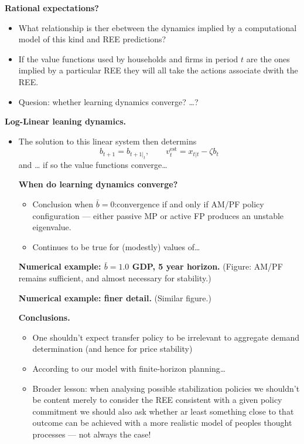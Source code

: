 \medskip\noindent
{\bf Rational expectations?}
\begin{itemize}
\item What relationship is ther ebetween the
dynamics implied by a computational model of
this kind and REE predictions?

\item If the value functions used by
households and firms in period $t$ are the
ones implied by a particular REE they will
all take the actions associate dwith the
REE.

\item Quesion: whether learning dynamics
converge? …?
\end{itemize}

\medskip\noindent
{\bf Log-Linear leaning dynamics.}
\begin{itemize}
\item The solution to this linear system
then determins
$$
b_{t+1}=b_{t+1|_t},\qquad 
v_t^{\operatorname{est}}=x_{t|t}-
\zeta b_t
$$
and …
if so the value functions converge…

\medskip\noindent
{\bf When do learning dynamics converge?}
\begin{itemize}
\item Conclusion when
$\bar{b}=0$:convergence if and only if AM/PF
policy configuration --- either passive MP
or active FP produces an unstable
eigenvalue.

\item Continues to be true for (modestly)
values of…
\end{itemize}

\medskip\noindent
{\bf Numerical example: $\bar{b}=1.0$ GDP, 5
year horizon.} (Figure: AM/PF remains
sufficient, and almost necessary for
stability.)

\medskip\noindent
{\bf Numerical example: finer detail.}
(Similar figure.)

\medskip\noindent
{\bf Conclusions.}
\begin{itemize}
\item One shouldn't expect transfer policy
to be irrelevant to aggregate demand
determination (and hence for price
stability)

\item According to our model with
finite-horizon planning…

\item Broader lesson: when analysing
possible stabilization policies we
shouldn't be content merely to consider
the REE consistent with a given policy
commitment we should also ask whether ar
least something close to that outcome can be
achieved with a more realistic model of
peoples thought processes --- not always the
case!
\end{itemize}


\end{itemize}

